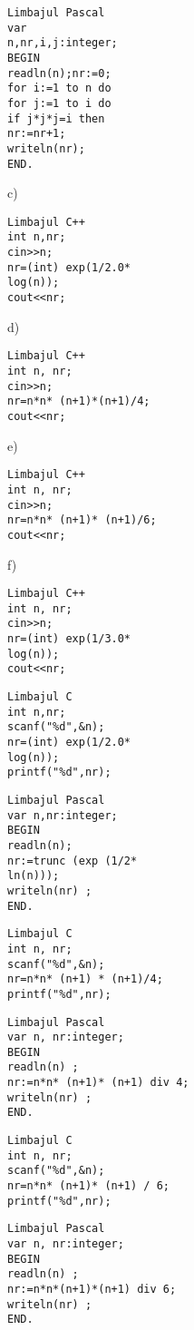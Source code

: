 \begin{verbatim}
Limbajul Pascal
var
n,nr,i,j:integer;
BEGIN
readln(n);nr:=0;
for i:=1 to n do
for j:=1 to i do
if j*j*j=i then
nr:=nr+1;
writeln(nr);
END.
\end{verbatim}

c)

\begin{verbatim}
Limbajul C++
int n,nr;
cin>>n;
nr=(int) exp(1/2.0*
log(n));
cout<<nr;
\end{verbatim}

d)

\begin{verbatim}
Limbajul C++
int n, nr;
cin>>n;
nr=n*n* (n+1)*(n+1)/4;
cout<<nr;
\end{verbatim}

e)

\begin{verbatim}
Limbajul C++
int n, nr;
cin>>n;
nr=n*n* (n+1)* (n+1)/6;
cout<<nr;
\end{verbatim}

f)

\begin{verbatim}
Limbajul C++
int n, nr;
cin>>n;
nr=(int) exp(1/3.0*
log(n));
cout<<nr;
\end{verbatim}

\begin{verbatim}
Limbajul C
int n,nr;
scanf("%d",&n);
nr=(int) exp(1/2.0*
log(n));
printf("%d",nr);
\end{verbatim}

\begin{verbatim}
Limbajul Pascal
var n,nr:integer;
BEGIN
readln(n);
nr:=trunc (exp (1/2*
ln(n)));
writeln(nr) ;
END.
\end{verbatim}

\begin{verbatim}
Limbajul C
int n, nr;
scanf("%d",&n);
nr=n*n* (n+1) * (n+1)/4;
printf("%d",nr);
\end{verbatim}

\begin{verbatim}
Limbajul Pascal
var n, nr:integer;
BEGIN
readln(n) ;
nr:=n*n* (n+1)* (n+1) div 4;
writeln(nr) ;
END.
\end{verbatim}

\begin{verbatim}
Limbajul C
int n, nr;
scanf("%d",&n);
nr=n*n* (n+1)* (n+1) / 6;
printf("%d",nr);
\end{verbatim}

\begin{verbatim}
Limbajul Pascal
var n, nr:integer;
BEGIN
readln(n) ;
nr:=n*n*(n+1)*(n+1) div 6;
writeln(nr) ;
END.
\end{verbatim}

